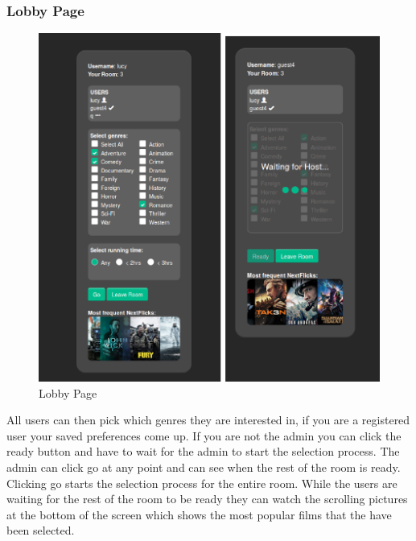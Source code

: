 \documentclass{article}
\begin{document}
\subsubsection{Lobby Page}
\begin{figure}[H]
\centering
\caption{Lobby Page}
\label{sec:sysarchitecture}
\includegraphics[scale=0.5]{lobbypage}
\end{figure}
All users can then pick which genres they are interested in, if you are a registered user your saved preferences come up. If you are not the admin you can click the ready button and have to wait for the admin to start the selection process. The admin can click go at any point and can see when the rest of the room is ready. Clicking go starts the selection process for the entire room. While the users are waiting for the rest of the room to be ready they can watch the scrolling pictures at the bottom of the screen which shows the most popular films that the have been selected.
\end{document}
